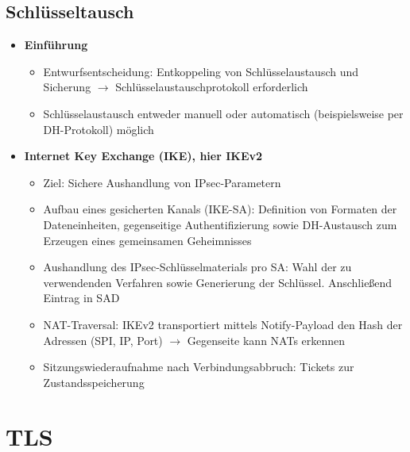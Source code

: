 \subsection{Schlüsseltausch}
\begin{itemize}
	\item \textbf{Einführung}
	\begin{itemize}
		\item Entwurfsentscheidung: Entkoppeling von Schlüsselaustausch und Sicherung \(\rightarrow\) Schlüsselaustauschprotokoll erforderlich
		\item Schlüsselaustausch entweder manuell oder automatisch (beispielsweise per DH-Protokoll) möglich
	\end{itemize}
	\item \textbf{Internet Key Exchange (IKE), hier IKEv2}
	\begin{itemize}
		\item Ziel: Sichere Aushandlung von IPsec-Parametern
		\item Aufbau eines gesicherten Kanals (IKE-SA): Definition von Formaten der Dateneinheiten, gegenseitige Authentifizierung sowie DH-Austausch zum Erzeugen eines gemeinsamen Geheimnisses
		\item Aushandlung des IPsec-Schlüsselmaterials pro SA: Wahl der zu verwendenden Verfahren sowie Generierung der Schlüssel. Anschließend Eintrag in SAD
		\item NAT-Traversal: IKEv2 transportiert mittels Notify-Payload den Hash der Adressen (SPI, IP, Port) \(\rightarrow\) Gegenseite kann NATs erkennen
		\item Sitzungswiederaufnahme nach Verbindungsabbruch: Tickets zur Zustandsspeicherung
	\end{itemize}
\end{itemize}



\section{TLS}

